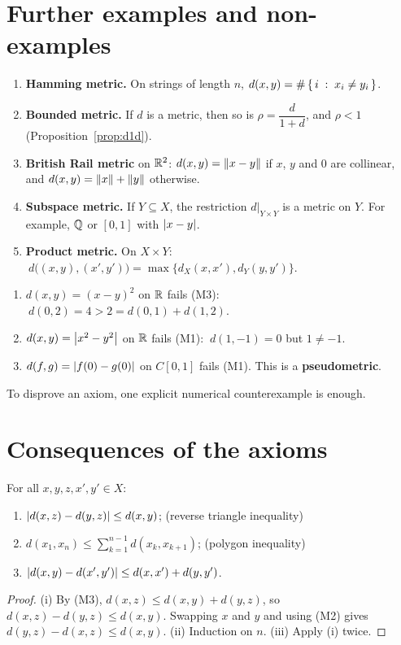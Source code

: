 \section{Further examples and non-examples}
\begin{example}\label{ex:others}
\leavevmode
\begin{enumerate}[label=(\alph*)]
  \item \textbf{Hamming metric.} On strings of length $n$, $d(x,y)=\#\left\{\, i \;:\; x_i\ne y_i \,\right\}$.
  \item \textbf{Bounded metric.} If $d$ is a metric, then so is $\rho=\dfrac{d}{1+d}$, and $\rho<1$ (Proposition~\ref{prop:d1d}).
  \item \textbf{British Rail metric} on $\mathbb{R}^2$: $d(x,y)=\left\lVert x-y\right\rVert$ if $x$, $y$ and $0$ are collinear, and $d(x,y)=\left\lVert x\right\rVert+\left\lVert y\right\rVert$ otherwise.
  \item \textbf{Subspace metric.} If $Y\subseteq X$, the restriction $d|_{Y\times Y}$ is a metric on $Y$. For example, $\mathbb{Q}$ or $[0,1]$ with $\left\lvert x-y\right\rvert$.
  \item \textbf{Product metric.} On $X\times Y$: $\ d\bigl((x,y),(x',y')\bigr)=\max\{d_X(x,x'),d_Y(y,y')\}$.
\end{enumerate}
\end{example}

\begin{example}\label{ex:nonmetric}
\leavevmode
\begin{enumerate}[label=(\alph*)]
  \item $d(x,y)=(x-y)^2$ on $\mathbb{R}$ fails \textup{(M3)}: $\ d(0,2)=4>2=d(0,1)+d(1,2)$.
  \item $d(x,y)=\left\lvert x^2-y^2\right\rvert$ on $\mathbb{R}$ fails \textup{(M1)}: $\ d(1,-1)=0$ but $1\ne-1$.
  \item $d(f,g)=\left\lvert f(0)-g(0)\right\rvert$ on $C[0,1]$ fails \textup{(M1)}. This is a \textbf{pseudometric}.
\end{enumerate}
To disprove an axiom, one explicit numerical counterexample is enough.
\end{example}

\section{Consequences of the axioms}
\begin{lemma}\label{lem:reverse}
For all $x,y,z,x',y'\in X$:
\begin{enumerate}[label=(\roman*)]
  \item $\left\lvert d(x,z)-d(y,z)\right\rvert\le d(x,y)$; \hfill(reverse triangle inequality)
  \item $d(x_1,x_n)\le\sum_{k=1}^{n-1}d(x_k,x_{k+1})$; \hfill(polygon inequality)
  \item $\left\lvert d(x,y)-d(x',y')\right\rvert\le d(x,x')+d(y,y')$.
\end{enumerate}
\end{lemma}
\begin{proof}
(i) By \textup{(M3)}, $d(x,z)\le d(x,y)+d(y,z)$, so $d(x,z)-d(y,z)\le d(x,y)$. Swapping $x$ and $y$ and using \textup{(M2)} gives $d(y,z)-d(x,z)\le d(x,y)$. (ii) Induction on $n$. (iii) Apply (i) twice.
\end{proof}


